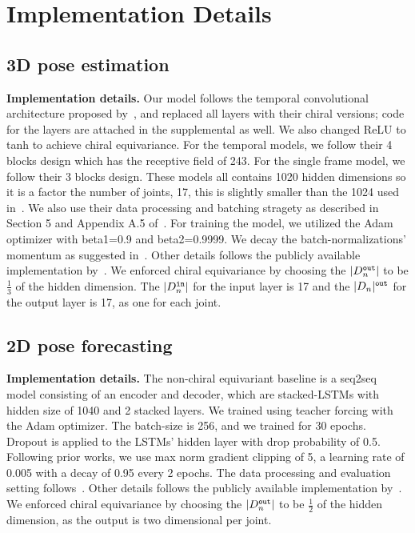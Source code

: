 \documentclass{article}
\begin{document}
\section{Implementation Details}\label{extra_implement}
\subsection{3D pose estimation}
\textbf{Implementation details.}
Our model follows the temporal convolutional architecture proposed by~\citet{pavllo20193d}, and replaced all layers with their chiral versions; code for the layers are attached in the supplemental as well.
We also changed ReLU to tanh to achieve chiral equivariance. For the temporal models, we follow their 4 blocks design which has the receptive field of 243. For the single frame model, we follow their 3 blocks design. These models all contains 1020 hidden dimensions so it is a factor the number of joints, 17, this is slightly smaller than the 1024 used in~\cite{pavllo20193d}. We also use their data processing and batching stragety as described in Section 5 and Appendix A.5 of~\cite{pavllo20193d}. For training the model, we utilized the Adam optimizer with beta1=0.9 and beta2=0.9999. We decay the batch-normalizations' momentum as suggested in~\cite{pavllo20193d}. Other details follows the publicly available implementation by~\citet{pavllo20193d}.  We enforced chiral equivariance by choosing the $|D_n^{\tt out}|$ to be $\frac{1}{3}$ of the hidden dimension. The $|D_n^{\tt in}|$ for the input layer is 17 and the $|D_n|^{\tt out}$ for the output layer is 17, as one for each joint.

\subsection{2D pose forecasting}
\textbf{Implementation details.}
The non-chiral equivariant baseline is a seq2seq model consisting of an encoder and decoder, which are stacked-LSTMs with hidden size of 1040 and 2 stacked layers. We trained using teacher forcing with the Adam optimizer. The batch-size is 256, and we trained for 30 epochs. Dropout is applied to the LSTMs' hidden layer with drop probability of 0.5. Following prior works, we use max norm gradient clipping of 5, a learning rate of 0.005 with a decay of 0.95 every 2 epochs. The data processing and evaluation setting follows~\cite{chiu2019action}. Other details follows the publicly available implementation by~\citet{chiu2019action}. We enforced chiral equivariance by choosing the $|D_n^{\tt out}|$ to be $\frac{1}{2}$ of the hidden dimension, as the output is two dimensional per joint.
\end{document}
